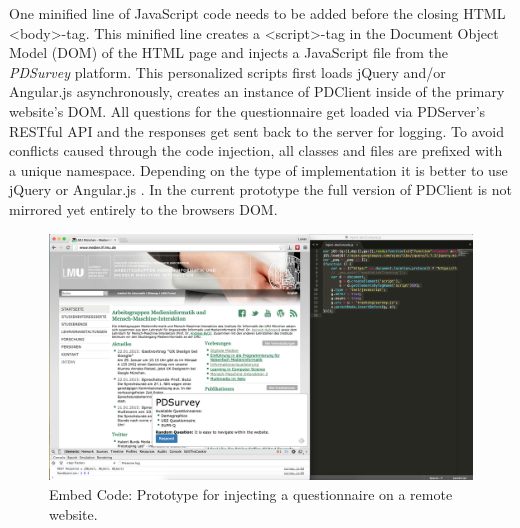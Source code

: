 		One minified line of JavaScript code needs to be added before the closing HTML <body>-tag. This minified line creates a <script>-tag in the Document Object Model (DOM) of the HTML page and injects a JavaScript file from the \textit{PDSurvey} platform. This personalized scripts first loads jQuery and/or Angular.js asynchronously, creates an instance of PDClient inside of the primary website's DOM. All questions for the questionnaire get loaded via PDServer's RESTful API and the responses get sent back to the server for logging. To avoid conflicts caused through the code injection, all classes and files are prefixed with a unique namespace. Depending on the type of implementation it is better to use jQuery or Angular.js \cite{AirPair2014jQueryAngular}. In the current prototype the full version of PDClient is not mirrored yet entirely to the browsers DOM.


	\begin{figure}
	    \begin{center}
	   \includegraphics[width=.8\columnwidth]{img/screenshots/pdsurvey-overview/injection.png}
	    \end{center}
	 \caption[Embed Code]{Embed Code: Prototype for injecting a questionnaire on a remote website.}
	 \label{fig:4-embed-code}
	\end{figure}